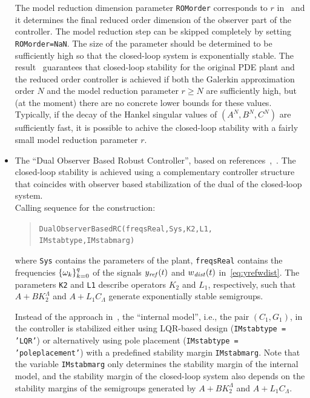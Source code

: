 \documentclass[11pt, a4paper]{amsart}
\newcommand{\CL}{C_\Lambda}
\theoremstyle{definition}
\numberwithin{equation}{section}
\newcommand{\yref}{y_{\mbox{\scriptsize\textit{ref}}}}
\newcommand{\wdist}{w_{\mbox{\scriptsize\textit{dist}}}}
\begin{document}
\begin{itemize}
The model reduction dimension parameter \texttt{ROMorder} corresponds to $r$ in~ and it determines the final reduced order dimension of the observer part of the controller. The model reduction step can be skipped completely by setting \texttt{ROMorder=NaN}. The size of the parameter should be determined to be sufficiently high so that the closed-loop system is exponentially stable. The result~ guarantees that closed-loop stability for the original PDE plant and the reduced order controller is achieved if both the Galerkin approximation order $N$ and the model reduction parameter $r\geq N$ are sufficiently high, but (at the moment) there are no concrete lower bounds for these values. Typically, if the decay of the Hankel singular values of $(A^N,B^N,C^N)$ are sufficiently fast, it is possible to achive the closed-loop stability with a fairly small model reduction parameter $r$.

	\bigskip

  \item The ``Dual Observer Based Robust Controller'', based on references~,~. The closed-loop stability is achieved using a complementary controller structure that coincides with observer based stabilization of the dual of the closed-loop system.\\[1ex]
      Calling sequence for the construction:\\[-1ex]
     \begin{quotation}
       \texttt{DualObserverBasedRC(freqsReal,Sys,K2,L1,\\
	 \phantom{a}\hspace{3.7cm} IMstabtype,IMstabmarg)}
     \end{quotation}
     \medskip
     where \texttt{Sys} contains the parameters of the plant, \texttt{freqsReal} contains the frequencies $\{\omega_k\}_{k=0}^q$ of the signals $\yref(t)$ and $\wdist(t)$ in~\eqref{eq:yrefwdist}. The parameters \texttt{K2} and \texttt{L1} describe operators $K_2$ and $L_1$, respectively, such that $A+BK_2^\Lambda$ and $A+L_1\CL$ generate exponentially stable semigroups.

     Instead of the approach in~\cite{Pau16a}, the ``internal model'', i.e., the pair $(C_1,G_1)$, in the controller is stabilized either using LQR-based design (\texttt{IMstabtype = 'LQR'}) or alternatively using pole placement (\texttt{IMstabtype = 'poleplacement'}) with a predefined stability margin \texttt{IMstabmarg}. Note that the variable \texttt{IMstabmarg} only determines the stability margin of the internal model, and the stability margin of the closed-loop system also depends on the stability margins of the semigroups generated by $A+BK_2^\Lambda$ and $A+L_1\CL$.


\end{itemize}
\end{document}
